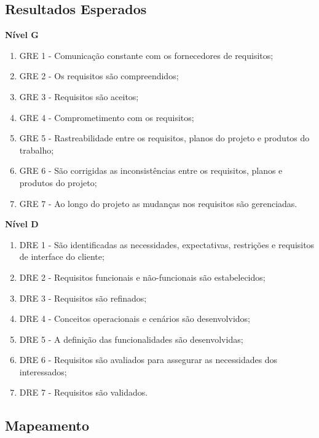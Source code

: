 \subsection{Resultados Esperados}

\textbf{Nível G}

\begin{enumerate}
\item GRE 1 - Comunicação constante com os fornecedores de requisitos;
\item GRE 2 - Os requisitos são compreendidos;
\item GRE 3 - Requisitos são aceitos;
\item GRE 4 - Comprometimento com os requisitos;
\item GRE 5 - Rastreabilidade entre os requisitos, planos do projeto e produtos do trabalho;
\item GRE 6 - São corrigidas as inconsistências entre os requisitos, planos e produtos do projeto;
\item GRE 7 - Ao longo do projeto as mudanças nos requisitos são gerenciadas.
\end{enumerate}

\textbf{Nível D}

\begin{enumerate}
\item DRE 1 - São identificadas as necessidades, expectativas, restrições e requisitos de interface do cliente;
\item DRE 2 - Requisitos funcionais e não-funcionais são estabelecidos;
\item DRE 3 - Requisitos são refinados;
\item DRE 4 - Conceitos operacionais e cenários são desenvolvidos;
\item DRE 5 - A definição das  funcionalidades são desenvolvidas;
\item DRE 6 - Requisitos são avaliados para assegurar as necessidades dos interessados;
\item DRE 7 - Requisitos são validados.
\end{enumerate}

\subsection{Mapeamento}

